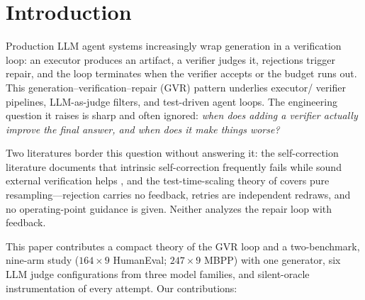 \documentclass[10pt]{article}
\begin{document}
\section{Introduction}\label{sec:intro}

Production LLM agent systems increasingly wrap generation in a
verification loop: an executor produces an artifact, a verifier
judges it, rejections trigger repair, and the loop terminates when
the verifier accepts or the budget runs out.  This
generation--verification--repair (GVR) pattern underlies executor/
verifier pipelines, LLM-as-judge filters, and test-driven agent
loops.  The engineering question it raises is sharp and often
ignored: \emph{when does adding a verifier actually improve the
final answer, and when does it make things worse?}

Two literatures border this question without answering it: the
self-correction literature documents that intrinsic self-correction
frequently fails while sound external verification helps
\citep{stechly2024selfverify,kamoi2024when,huang2024cannot}, and the
test-time-scaling theory of \citet{dorner2026rocnreroll} covers pure
resampling---rejection carries no feedback, retries are independent
redraws, and no operating-point guidance is given.  Neither
analyzes the repair loop with feedback.

This paper contributes a compact theory of the GVR loop and a
two-benchmark, nine-arm study ($164 \times 9$ HumanEval;
$247 \times 9$ MBPP) with one generator, six LLM judge
configurations from three model families, and silent-oracle
instrumentation of every attempt.  Our contributions:
\end{document}
